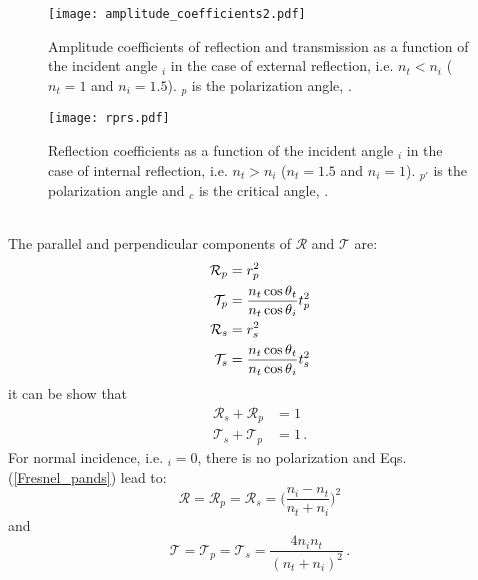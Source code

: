 \begin{figure}[h]
  \begin{minipage}[h]{0.4\textwidth}
    \texttt{[image: amplitude\_coefficients2.pdf]}
    \caption{Amplitude coefficients of reflection and transmission as a function of the incident angle \myangle$_i$  in the case of external reflection, i.e. $n_t<n_i$
($n_t = 1$ and $n_i=1.5$). \myangle$_p$ is the polarization angle, \cite{hecht1998hecht}.}
    \label{fig:coefficients}
  \end{minipage} \hspace{2.5cm}
  \begin{minipage}[h]{0.4\textwidth}
    \texttt{[image: rprs.pdf]}
    \caption{Reflection coefficients as a function of the incident angle \myangle$_i$ in the case of internal reflection, i.e. $n_t>n_i$
($n_t = 1.5$ and $n_i=1$). \myangle$_{p\prime}$ is the polarization angle and \myangle$_c$ is the critical angle, \cite{hecht1998hecht}.}
   \label{fig:coefficients2}
 \end{minipage}
\end{figure}
\\ The parallel and perpendicular components of $\mathcal{R}$ and $\mathcal{T}$ are:
\begin{equation}\label{Fresnel_pands}
\begin{split}
\mathcal{R}_p& =  {r_p^2}\\
\mathcal{T}_p &=  \frac{n_t \cos\mbox{$\theta$}_t}{n_t \cos\mbox{$\theta$}_i}t_p^2\\
\mathcal{R}_s &=  r_s^2\\
\mathcal{T}_s &= \frac{n_t \cos\mbox{$\theta$}_t}{n_t \cos\mbox{$\theta$}_i}t_s^2\\
\end{split}
\end{equation}
it can be show that
\begin{equation}
\begin{split}
\mathcal{R}_s+\mathcal{R}_p &= 1\\
\mathcal{T}_s+\mathcal{T}_p &=1\,.
\end{split}
\end{equation}
For normal incidence, i.e. \myangle$_i = 0$, there is no polarization and Eqs. (\ref{Fresnel_pands}) lead to:
\begin{equation}
\mathcal{R} = \mathcal{R}_p = \mathcal{R}_s = \Bigg(\frac{n_i-n_t}{n_t+n_i}\Bigg)^2
\end{equation}
and 
\begin{equation}
\mathcal{T} = \mathcal{T}_p = \mathcal{T}_s = \frac{4n_i n_t}{(n_t+n_i)^2}\,.
\end{equation}
